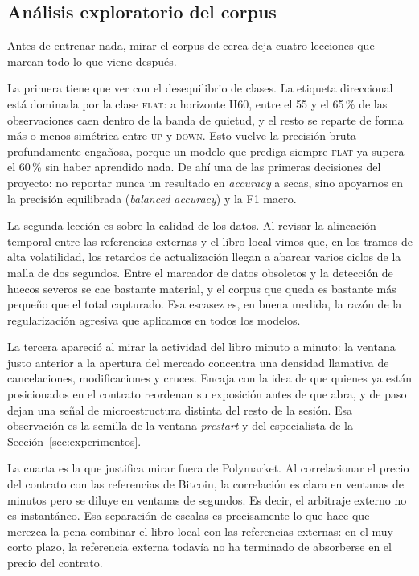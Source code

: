 \documentclass[11pt,a4paper]{article}
\begin{document}
\subsection{Análisis exploratorio del corpus}
\label{sec:eda}

Antes de entrenar nada, mirar el corpus de cerca deja cuatro lecciones que marcan
todo lo que viene después.

La primera tiene que ver con el desequilibrio de clases. La etiqueta direccional
está dominada por la clase \textsc{flat}: a horizonte H60, entre el 55 y el 65\,\%
de las observaciones caen dentro de la banda de quietud, y el resto se reparte de
forma más o menos simétrica entre \textsc{up} y \textsc{down}. Esto vuelve la
precisión bruta profundamente engañosa, porque un modelo que prediga siempre
\textsc{flat} ya supera el 60\,\% sin haber aprendido nada. De ahí una de las
primeras decisiones del proyecto: no reportar nunca un resultado en \emph{accuracy}
a secas, sino apoyarnos en la precisión equilibrada (\emph{balanced accuracy}) y la
F1 macro.

La segunda lección es sobre la calidad de los datos. Al revisar la alineación
temporal entre las referencias externas y el libro local vimos que, en los tramos
de alta volatilidad, los retardos de actualización llegan a abarcar varios ciclos
de la malla de dos segundos. Entre el marcador de datos obsoletos y la detección de
huecos severos se cae bastante material, y el corpus que queda es bastante más
pequeño que el total capturado. Esa escasez es, en buena medida, la razón de la
regularización agresiva que aplicamos en todos los modelos.

La tercera apareció al mirar la actividad del libro minuto a minuto: la ventana
justo anterior a la apertura del mercado concentra una densidad llamativa de
cancelaciones, modificaciones y cruces. Encaja con la idea de que quienes ya están
posicionados en el contrato reordenan su exposición antes de que abra, y de paso
dejan una señal de microestructura distinta del resto de la sesión. Esa observación
es la semilla de la ventana \emph{prestart} y del especialista de la
Sección~\ref{sec:experimentos}.

La cuarta es la que justifica mirar fuera de Polymarket. Al correlacionar el precio
del contrato con las referencias de Bitcoin, la correlación es clara en ventanas de
minutos pero se diluye en ventanas de segundos. Es decir, el arbitraje externo no
es instantáneo. Esa separación de escalas es precisamente lo que hace que merezca la
pena combinar el libro local con las referencias externas: en el muy corto plazo, la
referencia externa todavía no ha terminado de absorberse en el precio del contrato.
\end{document}
